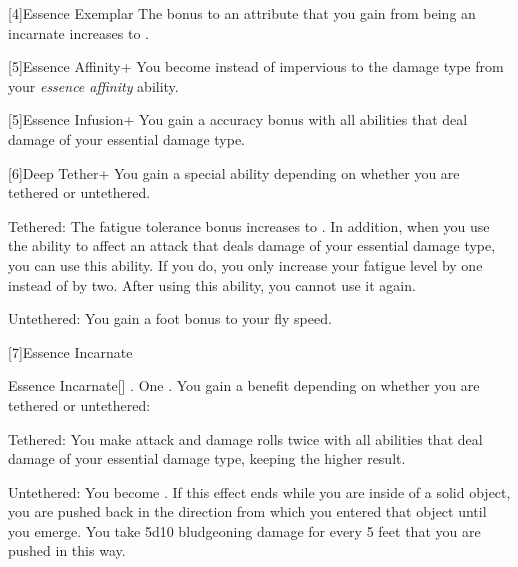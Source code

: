    [4]{Essence Exemplar} The bonus to an attribute that you gain from being an incarnate increases to .

    [5]{Essence Affinity+} You become  instead of impervious to the damage type from your \textit{essence affinity} ability.

    [5]{Essence Infusion+} You gain a  accuracy bonus with all abilities that deal damage of your essential damage type.

    [6]{Deep Tether+} You gain a special ability depending on whether you are tethered or untethered.
      \begin{raggeditemize}
        \item Tethered: The fatigue tolerance bonus increases to .
          In addition, when you use the  ability to affect an attack that deals damage of your essential damage type, you can use this ability.
          If you do, you only increase your fatigue level by one instead of by two.
          After using this ability, you  cannot use it again.
        \item Untethered: You gain a  foot bonus to your fly speed.
      \end{raggeditemize}

    [7]{Essence Incarnate}
      \begin{magicalactiveability}{Essence Incarnate}[]
        \abilityusagetime {}.
        \abilitycost One .
        \rankline
        You gain a benefit depending on whether you are tethered or untethered:
        \begin{raggeditemize}
          \item Tethered: You  make attack and damage rolls twice with all abilities that deal damage of your essential damage type, keeping the higher result.
          \item Untethered: You  become .
            If this effect ends while you are inside of a solid object, you are pushed back in the direction from which you entered that object until you emerge.
            You take 5d10 bludgeoning damage for every 5 feet that you are pushed in this way.
        \end{raggeditemize}

        {}
      \end{magicalactiveability}

